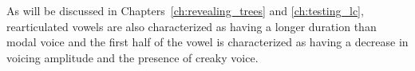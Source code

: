 As will be discussed in Chapters~\ref{ch:revealing_trees} and \ref{ch:testing_lc}, rearticulated vowels are also characterized as having a longer duration than modal voice and the first half of the vowel is characterized as having a decrease in voicing amplitude and the presence of creaky voice.




